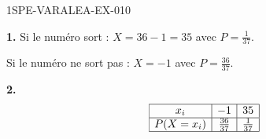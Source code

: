 \begin{corrige}{1SPE-VARALEA-EX-010}

\textbf{1.} Si le numéro sort : $X = 36 - 1 = 35$ avec $P = \frac{1}{37}$.

Si le numéro ne sort pas : $X = -1$ avec $P = \frac{36}{37}$.

\medskip
\textbf{2.}
\[
\begin{array}{|c|c|c|}
\hline
x_i & -1 & 35 \\
\hline
P(X=x_i) & \frac{36}{37} & \frac{1}{37} \\
\hline
\end{array}
\]

\end{corrige}
